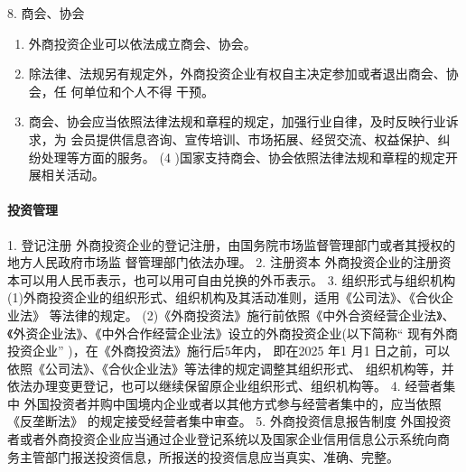 \documentclass[UTF8,12pt]{ctexart}
\numberwithin{equation}{section} %
\numberwithin{figure}{section}
\numberwithin{table}{section}
\begin{document}
	8. 商会、协会
	\begin{enumerate}
		\item 外商投资企业可以依法成立商会、协会。
		
		\item 除法律、法规另有规定外，外商投资企业有权自主决定参加或者退出商会、协会，任 何单位和个人不得 干预。
		
		\item 商会、协会应当依照法律法规和章程的规定，加强行业自律，及时反映行业诉求，为 会员提供信息咨询、宣传培训、市场拓展、经贸交流、权益保护、纠纷处理等方面的服务。 (4 )国家支持商会、协会依照法律法规和章程的规定开展相关活动。
	\end{enumerate}
	
	\paragraph{投资管理}
	1. 登记注册 外商投资企业的登记注册，由国务院市场监督管理部门或者其授权的地方人民政府市场监 督管理部门依法办理。
	2. 注册资本 外商投资企业的注册资本可以用人民币表示，也可以用可自由兑换的外币表示。
	3. 组织形式与组织机构 (1)外商投资企业的组织形式、组织机构及其活动准则，适用《公司法》、《合伙企业法》 等法律的规定。 (2)《外商投资法》施行前依照《中外合资经营企业法》、《外资企业法》、《中外合作经营企业法》设立的外商投资企业(以下简称“ 现有外商投资企业” )，在《外商投资法》施行后5年内， 即在2025 年1 月1 日之前，可以依照《公司法》、《合伙企业法》等法律的规定调整其组织形式、 组织机构等，并依法办理变更登记，也可以继续保留原企业组织形式、组织机构等。
	4. 经营者集中 外国投资者并购中国境内企业或者以其他方式参与经营者集中的，应当依照《反垄断法》 的规定接受经营者集中审查。
	5. 外商投资信息报告制度 外国投资者或者外商投资企业应当通过企业登记系统以及国家企业信用信息公示系统向商 务主管部门报送投资信息，所报送的投资信息应当真实、准确、完整。
	
\end{document}
